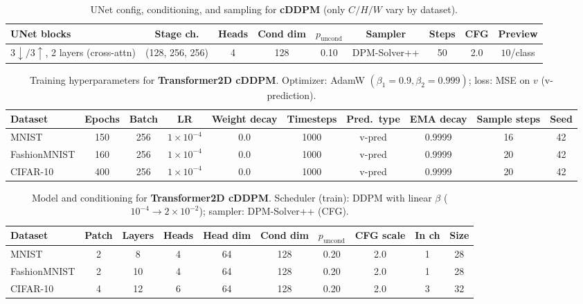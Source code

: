 \begin{table}[H]
\centering
\scriptsize
\caption{UNet config, conditioning, and sampling for \textbf{cDDPM} (only $C/H/W$ vary by dataset).}
\label{tab:cddpm-model}
\begin{adjustbox}{max width=\linewidth}
\begin{tabular}{@{}lcccccccc@{}}
\toprule
UNet blocks & Stage ch. & Heads & Cond dim & $p_{\text{uncond}}$ & Sampler & Steps & CFG & Preview \\
\midrule
$3\downarrow / 3\uparrow$, 2 layers (cross-attn) & (128, 256, 256) & 4 & 128 & 0.10 & DPM-Solver++ & 50 & 2.0 & $10$/class \\
\bottomrule
\end{tabular}
\end{adjustbox}
\end{table}

\begin{table}[H]
\centering
\scriptsize
\caption{Training hyperparameters for \textbf{Transformer2D cDDPM}. Optimizer: AdamW $(\beta_1{=}0.9,\beta_2{=}0.999)$; loss: MSE on $v$ (v-prediction).}
\label{tab:t2d-train}
\begin{adjustbox}{max width=\linewidth}
\begin{tabular}{@{}lccccccccc@{}}
\toprule
Dataset & Epochs & Batch & LR & Weight decay & Timesteps & Pred.\ type & EMA decay & Sample steps & Seed \\
\midrule
MNIST        & 150 & 256 & $1{\times}10^{-4}$ & 0.0 & 1000 & v-pred & 0.9999 & 16 & 42 \\
FashionMNIST & 160 & 256 & $1{\times}10^{-4}$ & 0.0 & 1000 & v-pred & 0.9999 & 20 & 42 \\
CIFAR-10     & 400 & 256 & $1{\times}10^{-4}$ & 0.0 & 1000 & v-pred & 0.9999 & 20 & 42 \\
\bottomrule
\end{tabular}
\end{adjustbox}
\end{table}

\begin{table}[H]
\centering
\scriptsize
\caption{Model and conditioning for \textbf{Transformer2D cDDPM}. Scheduler (train): DDPM with linear $\beta$ ($10^{-4}\!\to\!2\!\times\!10^{-2}$); sampler: DPM-Solver++ (CFG).}
\label{tab:t2d-model}
\begin{adjustbox}{max width=\linewidth}
\begin{tabular}{@{}lccccccccc@{}}
\toprule
Dataset & Patch & Layers & Heads & Head dim & Cond dim & $p_{\text{uncond}}$ & CFG scale & In ch & Size \\
\midrule
MNIST        & 2 & 8  & 4 & 64 & 128 & 0.20 & 2.0 & 1 & 28 \\
FashionMNIST & 2 & 10 & 4 & 64 & 128 & 0.20 & 2.0 & 1 & 28 \\
CIFAR-10     & 4 & 12 & 6 & 64 & 128 & 0.20 & 2.0 & 3 & 32 \\
\bottomrule
\end{tabular}
\end{adjustbox}
\end{table}

